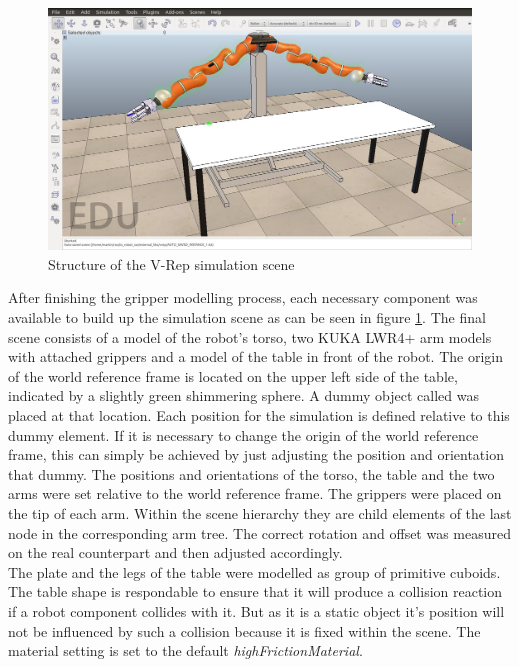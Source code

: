 \begin{figure}[ht]
	\centering
  	\includegraphics[width=1.0\textwidth]{images/simulation_scene.jpg}
	\caption{Structure of the V-Rep simulation scene}
	\label{fig:sim_scene}
\end{figure}

After finishing the gripper modelling process, each necessary component was available to build up the simulation scene as can be seen in figure \ref{fig:sim_scene}. The final scene consists of a model of the robot's torso, two KUKA LWR4+ arm models with attached grippers and a model of the table in front of the robot. The origin of the world reference frame is located on the upper left side of the table, indicated by a slightly green shimmering sphere. A dummy object called  was placed at that location. Each position for the simulation is defined relative to this dummy element. If it is necessary to change the origin of the world reference frame, this can simply be achieved by just adjusting the position and orientation that dummy. The positions and orientations of the torso, the table and the two arms were set relative to the world reference frame. The grippers were placed on the tip of each arm. Within the scene hierarchy they are child elements of the last node in the corresponding arm tree. The correct rotation and offset was measured on the real counterpart and then adjusted accordingly. \\

The plate and the legs of the table were modelled as group of primitive cuboids. The table shape is respondable to ensure that it will produce a collision reaction if a robot component collides with it. But as it is a static object it's position will not be influenced by such a collision because it is fixed within the scene. The material setting is set to the default \emph{highFrictionMaterial}. \\

